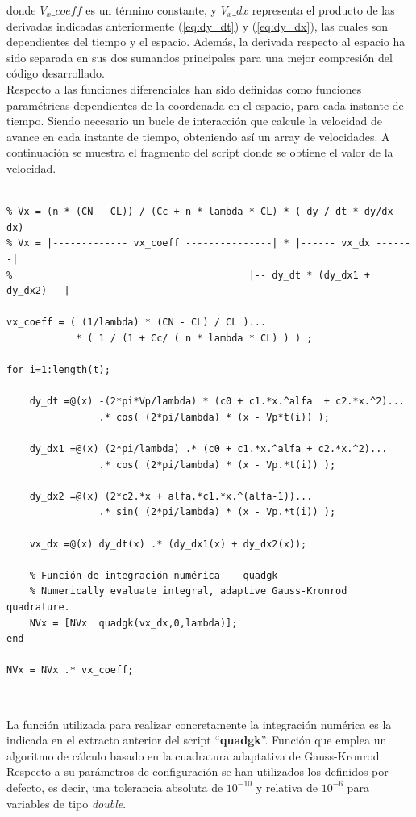 donde $V_{x}\_coeff$ es un término constante, y $V_x\_dx$ representa el producto de las derivadas indicadas anteriormente (\ref{eq:dy_dt}) y (\ref{eq:dy_dx}), las cuales son dependientes del tiempo y el espacio. Además, la derivada respecto al espacio ha sido separada en sus dos sumandos principales para una mejor compresión del código desarrollado.\\

Respecto a las funciones diferenciales han sido definidas como funciones paramétricas dependientes de la coordenada en el espacio, para cada instante de tiempo. Siendo necesario un bucle de interacción que calcule la velocidad de avance en cada instante de tiempo, obteniendo así un array de velocidades. A continuación se muestra el fragmento del script donde se obtiene el valor de la velocidad.
\begin{lstlisting}[]
%% Calculo de la velocidad de avance por integración numérica.

% Vx = (n * (CN - CL)) / (Cc + n * lambda * CL) * ( dy / dt * dy/dx dx)
% Vx = |------------- vx_coeff ---------------| * |------ vx_dx -------|
%                                         |-- dy_dt * (dy_dx1 + dy_dx2) --|

vx_coeff = ( (1/lambda) * (CN - CL) / CL )...
            * ( 1 / (1 + Cc/ ( n * lambda * CL) ) ) ;

for i=1:length(t);
  
    dy_dt =@(x) -(2*pi*Vp/lambda) * (c0 + c1.*x.^alfa  + c2.*x.^2)...
                .* cos( (2*pi/lambda) * (x - Vp*t(i)) );

    dy_dx1 =@(x) (2*pi/lambda) .* (c0 + c1.*x.^alfa + c2.*x.^2)...
                .* cos( (2*pi/lambda) * (x - Vp.*t(i)) );
    
    dy_dx2 =@(x) (2*c2.*x + alfa.*c1.*x.^(alfa-1))...
                .* sin( (2*pi/lambda) * (x - Vp.*t(i)) ); 
        
    vx_dx =@(x) dy_dt(x) .* (dy_dx1(x) + dy_dx2(x));                                     
   	
   	% Función de integración numérica -- quadgk
    % Numerically evaluate integral, adaptive Gauss-Kronrod quadrature.
    NVx = [NVx  quadgk(vx_dx,0,lambda)];
end
                                
NVx = NVx .* vx_coeff;

\end{lstlisting}
\

La función utilizada para realizar concretamente la integración numérica es la indicada en el extracto anterior del script ``\textbf{quadgk}''. Función que emplea un algoritmo de cálculo basado en la cuadratura adaptativa de Gauss-Kronrod. Respecto a su parámetros de configuración se han utilizados los definidos por defecto, es decir, una tolerancia absoluta de $10^{-10}$ y relativa de $10^{-6}$ para variables de tipo \textit{double}.

